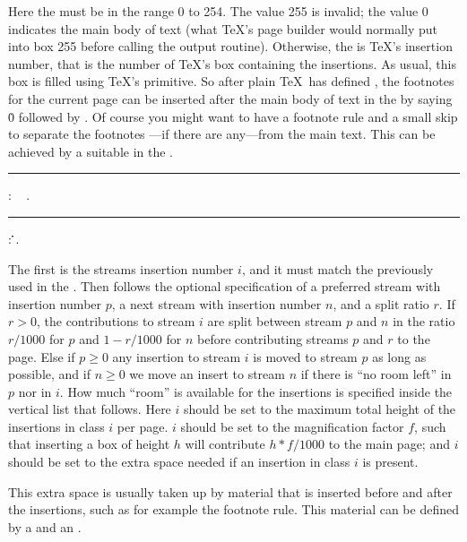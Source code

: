 Here  the  must be in the range 0 to 254. The value 255 is invalid;
the value 0 indicates the main body of text (what \TeX's page builder would normally put into
box 255 before calling the output routine).
Otherwise, the  is TeX's insertion number, that is the number of \TeX's box 
containing the insertions. As usual, this box is filled using \TeX's  primitive. 
So after plain \TeX\ has defined ,
the footnotes for the current page can be inserted after the main body of text in the 
by saying \.0 followed by .
Of course you might want to have a footnote rule and a small skip to separate the 
footnotes ---if there are any---from the main text. This can be achieved by a suitable
 in the .

\medskip
\rule{}:
  \OR\  .
\rule{}:
     \opt{\.{=}}
 \.{\LB}\.{\RB}.
\medskip


The first  is the streams insertion number $i$,
and it must match the  
previously used in the .
Then follows the optional specification of a preferred stream with insertion number $p$,
a next stream with insertion number $n$, and a split ratio $r$.
If $r>0$, the contributions to stream $i$ are split between
stream $p$ and $n$  in the ratio $r/1000$ for $p$ and $1-r/1000$ for $n$
before contributing streams $p$ and $r$ to the page.
Else if $p\ge0$ any insertion to stream $i$ is moved to stream $p$ as long as possible,
and if $n\ge0$ we move an insert to stream $n$ if there is ``no room left'' in $p$ nor in $i$.
How much ``room'' is available for the insertions is specified inside the vertical list
that follows.
Here $i$ should be set to the maximum total height of the insertions in class $i$ per page. 
$i$ should be set to the magnification factor $f$,
such that inserting a box of height $h$ will contribute $h*f/1000$ to the main page;
and $i$ should be set to the extra space needed if an insertion in class $i$ is present.

This extra space is usually taken up by material that is inserted before and after the insertions,
such as for example the footnote rule. This material can be defined by a 
 and an .

